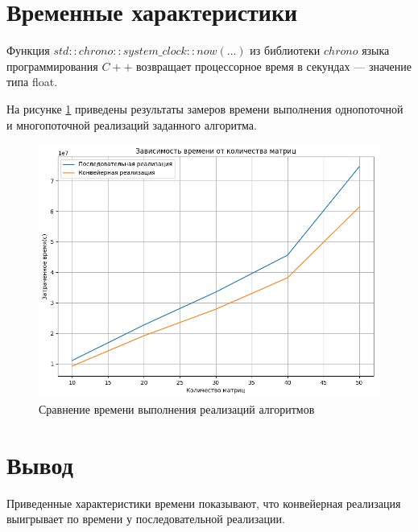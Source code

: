 \section{Временные характеристики}

Функция $std::chrono::system\_clock::now(...)$ из библиотеки $chrono$ языка программирования $C++$ возвращает  процессорное время в секундах --- значение типа float.

На рисунке \ref{img:time} приведены результаты замеров времени выполнения однопоточной и многопоточной  реализаций заданного алгоритма.

\begin{figure}[H]
	\begin{center}
		\includegraphics[scale=0.6]{img/time.png}
	\end{center}
	\captionsetup{justification=centering}
	\caption{Сравнение времени выполнения реализаций алгоритмов}
	\label{img:time}
\end{figure}

\section{Вывод}
Приведенные характеристики времени показывают, что конвейерная реализация выигрывает по времени у последовательной реализации.
